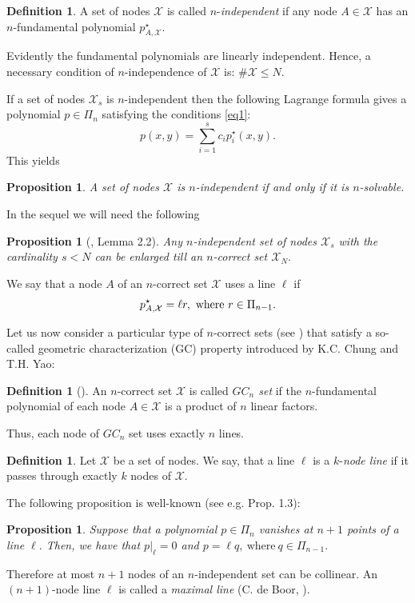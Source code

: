 \documentclass[a4paper,12pt]{article}
\newtheorem{proposition}[lemma]{Proposition}
\theoremstyle{definition}
\newtheorem{definition}[lemma]{Definition}
\numberwithin{equation}{section}
\numberwithin{figure}{section}
\newcommand{\Xset}{\mathcal{X}}
\begin{document}
\begin{definition}
A set of nodes $\Xset$
is called $n$-\emph{independent} if any node $A\in \Xset$ has an $n$-fundamental polynomial $p_{A,\Xset}^\star.$
\end{definition}
Evidently the fundamental polynomials are linearly independent. Hence, a necessary condition of $n$-independence of $\Xset$ is: $\#\Xset\le N.$

If a set of nodes $\Xset_s$
is $n$-independent then  
the following Lagrange formula gives a polynomial
$p\in\Pi_n$ satisfying the conditions \eqref{eq1}:
\begin{equation} \label{Lagrange}p(x,y)=\sum_{i=1}^sc_ip^\star_i(x,y).
\end{equation}
This yields 
\begin{proposition} A set of nodes $\Xset$
is $n$-independent if and only if it is $n$-solvable.
\end{proposition}

In the sequel we will need the following  
\begin{proposition} [\cite{HT}, Lemma 2.2] \label{HT1} Any $n$-independent  set of nodes $\Xset_s$ with the cardinality $s<N$ can be enlarged till an 
$n$-correct set $\Xset_N.$ 
\end{proposition}

We say that a node $A$ of an $n$-correct set $\Xset$ uses a line $\ell$ if
$$p_{A, \Xset}^\star= \ell r, \ \hbox{where} \ r\in\Pi_{n-1}.$$

Let us now consider a particular type of $n$-correct sets (see \cite{HV}) that satisfy a so-called geometric characterization (GC) property introduced by K.C. Chung and T.H. Yao:
\begin{definition}[\cite{CY77}]
An $n$-correct set ${\mathcal X}$ is called \emph{$GC_n$ set }
 if  the
$n$-fundamental polynomial of each node $A\in{\mathcal X}$ is a
product of $n$  linear factors.
\end{definition}
Thus, each node of $GC_n$ set uses exactly $n$ lines.

\begin{definition} Let $\Xset$ be a set of nodes.
We say, that a line $\ell$ is a $k$-\emph{node line} if it passes through exactly $k$ nodes of $\Xset.$\end{definition}


The following proposition is well-known (see e.g. \cite{HJZ09b}
Prop. 1.3):
\begin{proposition}\label{prp:n+1ell}
Suppose that a polynomial $p \in
\Pi_n$ vanishes at $n+1$ points of a line $\ell.$ Then, we have that
$p|_\ell=0$ and $p = \ell  q  ,\ \text{where} \ q\in\Pi_{n-1}.$
\end{proposition}
Therefore at most $n+1$ nodes of an $n$-independent set  can be collinear. An $(n+1)$-node line $\ell$ is called a \emph{maximal line} (C. de Boor, \cite{dB07}).
\end{document}
